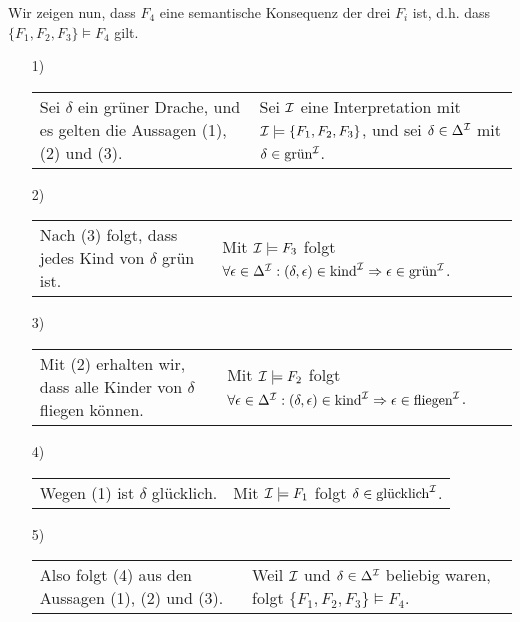     Wir zeigen nun, dass $F_4$ eine semantische Konsequenz der drei $F_i$ ist, d.h. dass $\{F_1, F_2, F_3 \} \models F_4$ gilt.
    \begin{enumerate}
        \item[1)]
        \begin{tabular}[t]{p{} p{}}
        Sei $\delta$ ein grüner Drache, und es gelten die Aussagen (1), (2) und (3). & Sei $\mathcal{I}$ eine Interpretation mit \newline
        $\mathcal{I} \models \{F_1, F_2, F_3 \}$, und sei $\delta \in \Delta^{\mathcal{I}}$ mit $\delta \in \text{grün}^{\mathcal{I}}$.
        \end{tabular}

        \item[2)]
        \begin{tabular}[t]{p{} p{}}
        Nach (3) folgt, dass jedes Kind von $\delta$ grün ist. & Mit $\mathcal{I} \models F_3$ folgt \newline
        $\forall \epsilon \in \Delta^{\mathcal{I}}: (\delta, \epsilon) \in \text{kind}^{\mathcal{I}} \Rightarrow \epsilon \in \text{grün}^{\mathcal{I}}$.
        \end{tabular}

        \item[3)]
        \begin{tabular}[t]{p{} p{}}
        Mit (2) erhalten wir, dass alle Kinder von $\delta$ fliegen können. & Mit $\mathcal{I} \models F_2$ folgt \newline
        $\forall \epsilon \in \Delta^{\mathcal{I}}: (\delta, \epsilon) \in \text{kind}^{\mathcal{I}} \Rightarrow \epsilon \in \text{fliegen}^{\mathcal{I}}$.
        \end{tabular}

        \item[4)]
        \begin{tabular}[t]{p{} p{}}
        Wegen (1) ist $\delta$ glücklich. & Mit $\mathcal{I} \models F_1$ folgt $\delta \in \text{glücklich}^{\mathcal{I}}$.
        \end{tabular}

        \item[5)]
        \begin{tabular}[t]{p{} p{}}
        Also folgt (4) aus den Aussagen (1), (2) und (3). & Weil $\mathcal{I}$ und $\delta \in \Delta^{\mathcal{I}}$ beliebig waren, folgt \newline
        $\{F_1, F_2, F_3\} \models F_4$.
        \end{tabular}
    \end{enumerate}

